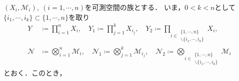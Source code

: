 	$(X_i,\mathscr{M}_i),\ (i=1,\cdots,n)$を可測空間の族とする．
	いま，$0 < k < n$として$\{i_1,\cdots,i_k\} \subset \{1,\cdots,n\}$を取り
	\begin{align}
		Y &\coloneqq \prod_{i=1}^n X_i,
		\quad Y_1 \coloneqq \prod_{j=1}^k X_{i_j},
		\quad Y_2 \coloneqq \prod_{i \in \substack{\{1,\cdots,n\} \\ \backslash \{i_1,\cdots,i_k\}}} X_i, \\
		\mathscr{N} &\coloneqq \bigotimes_{i=1}^n \mathscr{M}_i,
		\quad \mathscr{N}_1 \coloneqq \bigotimes_{j=1}^k \mathscr{M}_{i_j},
		\quad \mathscr{N}_2 \coloneqq \bigotimes_{i \in \substack{\{1,\cdots,n\} \\ \backslash \{i_1,\cdots,i_k\}}} \mathscr{M}_i
	\end{align}
	とおく．このとき，